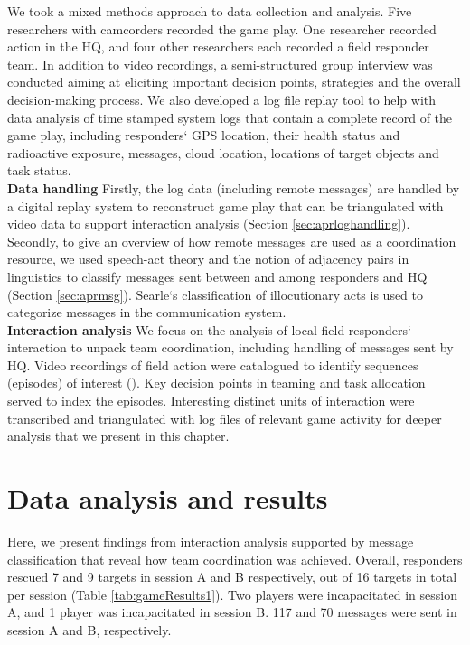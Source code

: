 We took a mixed methods approach to data collection and analysis. Five researchers with camcorders recorded the game play. One researcher recorded action in the HQ, and four other researchers each recorded a field responder team. In addition to video recordings, a semi-structured group interview was conducted aiming at eliciting important decision points, strategies and the overall decision-making process. We also developed a log file replay tool to help with data analysis of time stamped system logs that contain a complete record of the game play, including responders` GPS location, their health status and radioactive exposure, messages, cloud location, locations of target objects and task status. \\

\textbf{Data handling} Firstly, the log data (including remote messages) are handled by a digital replay system to reconstruct game play that can be triangulated with video data to support interaction analysis (Section \ref{sec:aprloghandling}). Secondly, to give an overview of how remote messages are used as a coordination resource, we used speech-act theory and the notion of adjacency pairs in linguistics to classify messages sent between and among responders and HQ (Section \ref{sec:aprmsg}). Searle`s classification of illocutionary acts \cite{Searle1976} is used to categorize messages in the communication system.\\

\textbf{Interaction analysis} We focus on the analysis of local field responders` interaction to unpack team coordination, including handling of messages sent by HQ. Video recordings of field action were catalogued to identify sequences (episodes) of interest (\cite{Heath2010}). Key decision points in teaming and task allocation served to index the episodes. Interesting distinct units of interaction were transcribed and triangulated with log files of relevant game activity for deeper analysis that we present in this chapter.\\

\section{Data analysis and results}
Here, we present findings from interaction analysis supported by message classification that reveal how team coordination was achieved. Overall, responders rescued 7 and 9 targets in session A and B respectively, out of 16 targets in total per session (Table \ref{tab:gameResults1}). Two players were incapacitated in session A, and 1 player was incapacitated in session B. 117 and 70 messages were sent in session A and B, respectively.\\

